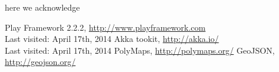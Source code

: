 \documentclass[a4paper, 11pt]{report}
\begin{document}
here we acknowledge


\begin{thebibliography}{1}

 Play Framework 2.2.2, \url{http://www.playframework.com}\\ Last visited: April 17th, 2014
 Akka tookit, \url{http://akka.io/}\\ Last visited: April 17th, 2014 
 PolyMaps, \url{http://polymaps.org/} %
 GeoJSON, \url{http://geojson.org/} %



\end{thebibliography}
\end{document}
